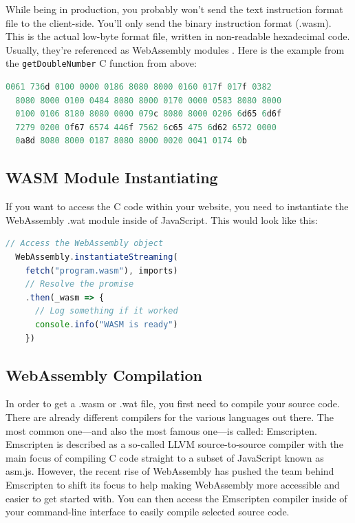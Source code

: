 \documentclass[10pt]{article}  %
\begin{document}
\begin{sloppypar}
  While being in production, you probably won’t send the text instruction format file to the client-side. You’ll only send the binary instruction format (.wasm). This is the actual low-byte format file, written in non-readable hexadecimal code. Usually, they’re referenced as WebAssembly modules \citep{mozilla_foundation_webassemblymodule_2023}. Here is the example from the \lstinline{getDoubleNumber} C function from above:

  \vspace{7pt}
  \begin{lstlisting}[language=C, caption=Code example from above compiled into the WebAssembly \\ Binary Instruction Format., label=lst:binary-example]
  0061 736d 0100 0000 0186 8080 8000 0160 017f 017f 0382
  8080 8000 0100 0484 8080 8000 0170 0000 0583 8080 8000
  0100 0106 8180 8080 0000 079c 8080 8000 0206 6d65 6d6f
  7279 0200 0f67 6574 446f 7562 6c65 475 6d62 6572 0000
  0a8d 8080 8000 0187 8080 8000 0020 0041 0174 0b\end{lstlisting}

  \subsection{WASM Module Instantiating}
  \label{sec:webassembly-module-instantiating}

  If you want to access the C code within your website, you need to instantiate the WebAssembly .wat module inside of JavaScript. This would look like this:

  \vspace{7pt}
  \begin{lstlisting}[language=JavaScript, caption=Instantiate the .wasm module in JavaScript., label=lst:javascript-example]
  // Access the WebAssembly object
  WebAssembly.instantiateStreaming(
    fetch("program.wasm"), imports)
    // Resolve the promise
    .then(_wasm => {
      // Log something if it worked
      console.info("WASM is ready")
    })\end{lstlisting}

  \subsection{WebAssembly Compilation}
  \label{sec:webassembly-compilation}

  In order to get a .wasm or .wat file, you first need to compile your source code. There are already different compilers for the various languages out there. The most common one—and also the most famous one—is called: Emscripten. Emscripten is described as a so-called LLVM source-to-source compiler with the main focus of compiling C code straight to a subset of JavaScript known as asm.js. However, the recent rise of WebAssembly has pushed the team behind Emscripten to shift its focus to help making WebAssembly more accessible and easier to get started with. You can then access the Emscripten compiler inside of your command-line interface to easily compile selected source code.


\end{sloppypar}
\end{document}
